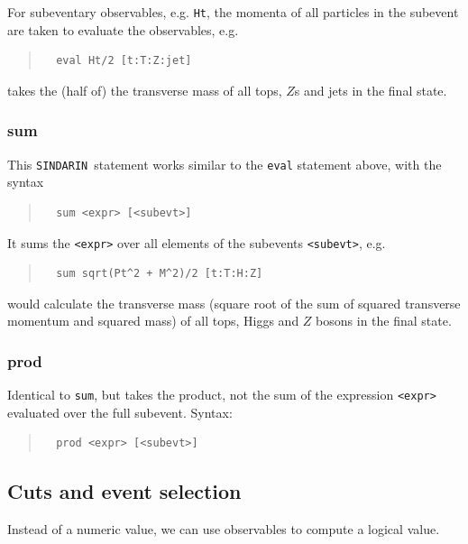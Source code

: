 \documentclass[12pt]{book}
\newcommand{\ttt}[1]{\texttt{#1}}
\newcommand{\sindarin}{\ttt{SINDARIN}}
\begin{document}
For subeventary observables, e.g. \ttt{Ht}, the momenta of all
particles in the subevent are taken to evaluate the observables, e.g.
\begin{quote}
\begin{verbatim}
  eval Ht/2 [t:T:Z:jet]
\end{verbatim}
\end{quote}
takes the (half of) the transverse mass of all tops, $Z$s and jets in
the final state.


\subsubsection{sum}

This \sindarin\ statement works similar to the \ttt{eval} statement
above, with the syntax
\begin{quote}
\begin{verbatim}
  sum <expr> [<subevt>]
\end{verbatim}
\end{quote}
It sums the \ttt{<expr>} over all elements of the subevents
\ttt{<subevt>}, e.g.
\begin{quote}
\begin{verbatim}
  sum sqrt(Pt^2 + M^2)/2 [t:T:H:Z]
\end{verbatim}
\end{quote}
would calculate the transverse mass (square root of the sum of squared
transverse momentum and squared mass) of all tops, Higgs and $Z$
bosons in the final state.

\subsubsection{prod}

Identical to \ttt{sum}, but takes the product, not the sum of the
expression \ttt{<expr>} evaluated over the full subevent. Syntax:
\begin{quote}
\begin{verbatim}
  prod <expr> [<subevt>]
\end{verbatim}
\end{quote}

\subsection{Cuts and event selection}
\label{sec:cuts}

Instead of a numeric value, we can use observables to compute a logical value.
\end{document}

